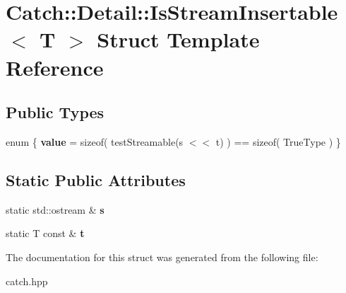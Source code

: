 \hypertarget{struct_catch_1_1_detail_1_1_is_stream_insertable}{}\section{Catch\+:\+:Detail\+:\+:Is\+Stream\+Insertable$<$ T $>$ Struct Template Reference}
\label{struct_catch_1_1_detail_1_1_is_stream_insertable}
\subsection*{Public Types}
\begin{DoxyCompactItemize}
\item 
\mbox{\label{struct_catch_1_1_detail_1_1_is_stream_insertable_a2e4508694da3bf368ff67733a7970edd}} 
enum \{ {\bfseries value} = sizeof( test\+Streamable(s $<$$<$ t) ) == sizeof( True\+Type )
 \}
\end{DoxyCompactItemize}
\subsection*{Static Public Attributes}
\begin{DoxyCompactItemize}
\item 
\mbox{\label{struct_catch_1_1_detail_1_1_is_stream_insertable_abe3d3c8e5d85665747faafffc9a96b00}} 
static std\+::ostream \& {\bfseries s}
\item 
\mbox{\label{struct_catch_1_1_detail_1_1_is_stream_insertable_a7d2a3da978b6736667a7b2f6d51f507f}} 
static T const  \& {\bfseries t}
\end{DoxyCompactItemize}


The documentation for this struct was generated from the following file\+:\begin{DoxyCompactItemize}
\item 
catch.\+hpp\end{DoxyCompactItemize}
